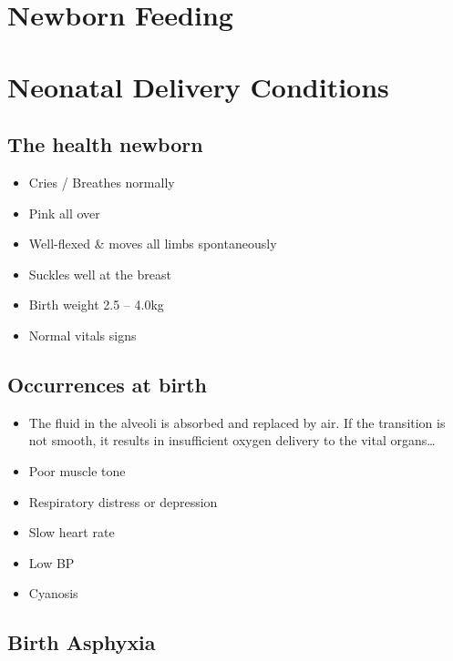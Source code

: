 \documentclass[
  letterpaper,
  DIV=11,
  numbers=noendperiod]{scrreprt}
\providecommand{\tightlist}{%
  \setlength{\itemsep}{0pt}\setlength{\parskip}{0pt}}\usepackage{longtable,booktabs,array}
\begin{document}
\hypertarget{newborn-feeding}{%
\chapter{Newborn Feeding}\label{newborn-feeding}}

\hypertarget{neonatal-delivery-conditions}{%
\chapter{Neonatal Delivery
Conditions}\label{neonatal-delivery-conditions}}

\hypertarget{the-health-newborn}{%
\section{The health newborn}\label{the-health-newborn}}

\begin{itemize}
\tightlist
\item
  Cries / Breathes normally
\item
  Pink all over
\item
  Well-flexed \& moves all limbs spontaneously
\item
  Suckles well at the breast
\item
  Birth weight 2.5 -- 4.0kg
\item
  Normal vitals signs
\end{itemize}

\hypertarget{occurrences-at-birth}{%
\section{Occurrences at birth}\label{occurrences-at-birth}}

\begin{itemize}
\tightlist
\item
  The fluid in the alveoli is absorbed and replaced by air. If the
  transition is not smooth, it results in insufficient oxygen delivery
  to the vital organs\ldots{}
\item
  Poor muscle tone
\item
  Respiratory distress or depression
\item
  Slow heart rate
\item
  Low BP
\item
  Cyanosis
\end{itemize}

\hypertarget{birth-asphyxia}{%
\section{Birth Asphyxia}\label{birth-asphyxia}}
\end{document}
